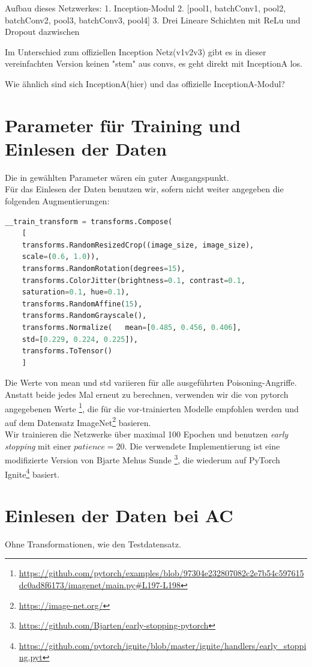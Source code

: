 \documentclass[11pt,a4paper]{article}
\numberwithin{equation}{section}
\begin{document}
	Aufbau dieses Netzwerkes:
	1. Inception-Modul
	2. [pool1, batchConv1, pool2, batchConv2, pool3, batchConv3, pool4]
	3. Drei Lineare Schichten mit ReLu und Dropout dazwischen
	
	Im Unterschied zum offiziellen Inception Netz(v1v2v3) gibt es in dieser 
	vereinfachten Version keinen "stem" aus convs, 
	es geht direkt mit InceptionA los.
	
	Wie ähnlich sind sich InceptionA(hier) und das offizielle InceptionA-Modul?
	
	\section{Parameter für Training und Einlesen der Daten}\label{param_net}
	Die in \cite{CH} gewählten Parameter wären ein guter Ausgangspunkt.\\
	Für das Einlesen der Daten benutzen wir, sofern nicht weiter angegeben die folgenden Augmentierungen:
	
	\begin{lstlisting}[language=Python, caption=Augemntierung beim Einlesen der Daten]
	__train_transform = transforms.Compose(
	[
	transforms.RandomResizedCrop((image_size, image_size), 
	scale=(0.6, 1.0)),
	transforms.RandomRotation(degrees=15),
	transforms.ColorJitter(brightness=0.1, contrast=0.1, 
	saturation=0.1, hue=0.1),
	transforms.RandomAffine(15),
	transforms.RandomGrayscale(),
	transforms.Normalize(	mean=[0.485, 0.456, 0.406], 
	std=[0.229, 0.224, 0.225]),
	transforms.ToTensor()
	]
	\end{lstlisting}
	Die Werte von mean und std variieren für alle ausgeführten Poisoning-Angriffe. Anstatt beide jedes Mal erneut zu berechnen, verwenden wir die von pytorch angegebenen Werte \footnote{\url{https://github.com/pytorch/examples/blob/97304e232807082c2e7b54c597615dc0ad8f6173/imagenet/main.py\#L197-L198}}, die für die vor-trainierten Modelle empfohlen werden und auf dem Datensatz ImageNet\footnote{\url{https://image-net.org/}} basieren.\\ 
	Wir trainieren die Netzwerke über maximal 100 Epochen und benutzen \textit{early stopping} mit einer $patience=20$. Die verwendete Implementierung ist eine modifizierte Version von Bjarte Mehus Sunde \footnote{\url{https://github.com/Bjarten/early-stopping-pytorch}}, die wiederum auf PyTorch Ignite\footnote{\url{https://github.com/pytorch/ignite/blob/master/ignite/handlers/early\_stopping.pyt}} basiert.\\
	
	\section{Einlesen der Daten bei AC}
	Ohne Transformationen, wie den Testdatensatz.
	
\end{document}
